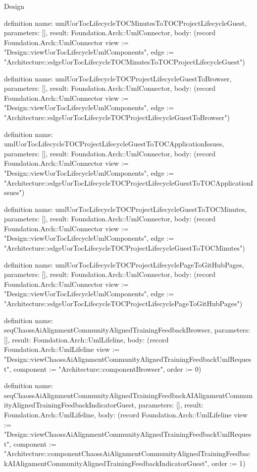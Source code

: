\begin{lexlean}{Design}
\begin{semanticmodule}
definition{
  name: umlUorTocLifecycleTOCMinutesToTOCProjectLifecycleGuest,
  parameters: [],
  result: Foundation.Arch::UmlConnector,
  body: (record Foundation.Arch::UmlConnector {view := "Design::viewUorTocLifecycleUmlComponents", edge := "Architecture::edgeUorTocLifecycleTOCMinutesToTOCProjectLifecycleGuest"})
}

definition{
  name: umlUorTocLifecycleTOCProjectLifecycleGuestToBrowser,
  parameters: [],
  result: Foundation.Arch::UmlConnector,
  body: (record Foundation.Arch::UmlConnector {view := "Design::viewUorTocLifecycleUmlComponents", edge := "Architecture::edgeUorTocLifecycleTOCProjectLifecycleGuestToBrowser"})
}

definition{
  name: umlUorTocLifecycleTOCProjectLifecycleGuestToTOCApplicationIssues,
  parameters: [],
  result: Foundation.Arch::UmlConnector,
  body: (record Foundation.Arch::UmlConnector {view := "Design::viewUorTocLifecycleUmlComponents", edge := "Architecture::edgeUorTocLifecycleTOCProjectLifecycleGuestToTOCApplicationIssues"})
}

definition{
  name: umlUorTocLifecycleTOCProjectLifecycleGuestToTOCMinutes,
  parameters: [],
  result: Foundation.Arch::UmlConnector,
  body: (record Foundation.Arch::UmlConnector {view := "Design::viewUorTocLifecycleUmlComponents", edge := "Architecture::edgeUorTocLifecycleTOCProjectLifecycleGuestToTOCMinutes"})
}

definition{
  name: umlUorTocLifecycleTOCProjectLifecyclePageToGitHubPages,
  parameters: [],
  result: Foundation.Arch::UmlConnector,
  body: (record Foundation.Arch::UmlConnector {view := "Design::viewUorTocLifecycleUmlComponents", edge := "Architecture::edgeUorTocLifecycleTOCProjectLifecyclePageToGitHubPages"})
}

definition{
  name: seqChaossAiAlignmentCommunityAlignedTrainingFeedbackBrowser,
  parameters: [],
  result: Foundation.Arch::UmlLifeline,
  body: (record Foundation.Arch::UmlLifeline {view := "Design::viewChaossAiAlignmentCommunityAlignedTrainingFeedbackUmlRequest", component := "Architecture::componentBrowser", order := 0})
}

definition{
  name: seqChaossAiAlignmentCommunityAlignedTrainingFeedbackAIAlignmentCommunityAlignedTrainingFeedbackIndicatorGuest,
  parameters: [],
  result: Foundation.Arch::UmlLifeline,
  body: (record Foundation.Arch::UmlLifeline {view := "Design::viewChaossAiAlignmentCommunityAlignedTrainingFeedbackUmlRequest", component := "Architecture::componentChaossAiAlignmentCommunityAlignedTrainingFeedbackAIAlignmentCommunityAlignedTrainingFeedbackIndicatorGuest", order := 1})
}


\end{semanticmodule}
\end{lexlean}

